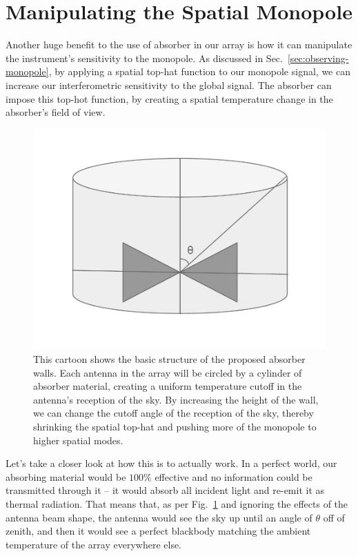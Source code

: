 \section{Manipulating the Spatial Monopole}

Another huge benefit to the use of absorber in our array is how it can 
manipulate the instrument's sensitivity to the monopole. As discussed in 
Sec.~\ref{sec:observing-monopole}, by applying a spatial top-hat function to 
our monopole signal, we can increase our interferometric sensitivity to the 
global signal. The absorber can impose this top-hot function, by creating a 
spatial temperature change in the absorber's field of view.

\begin{figure}
    \begin{center}
    \includegraphics[width=\linewidth]{absorber-structure.png}
    \end{center}
    \caption{
        This cartoon shows the basic structure of the proposed absorber walls.  
        Each antenna in the array will be circled by a cylinder of absorber 
        material, creating a uniform temperature cutoff in the antenna's 
        reception of the sky. By increasing the height of the wall, we can 
        change the cutoff angle of the reception of the sky, thereby shrinking 
        the spatial top-hat and pushing more of the monopole to higher spatial 
        modes.
    }
    \label{fig:absorber-structure}
\end{figure}

Let's take a closer look at how this is to actually work. In a perfect world, 
our absorbing material would be $100\%$ effective and no information could be 
transmitted through it -- it would absorb all incident light and re-emit it as 
thermal radiation. That means that, as per Fig.~\ref{fig:absorber-structure} 
and ignoring the effects of the antenna beam shape, the antenna would see the 
sky up until an angle of $\theta$ off of zenith, and then it would see a 
perfect blackbody matching the ambient temperature of the array everywhere 
else.


